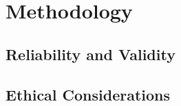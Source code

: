 \chapter{Methodology}

\lipsum[20]

\section{Reliability and Validity}

\lipsum[21-22]

\section{Ethical Considerations}

\lipsum[23]
